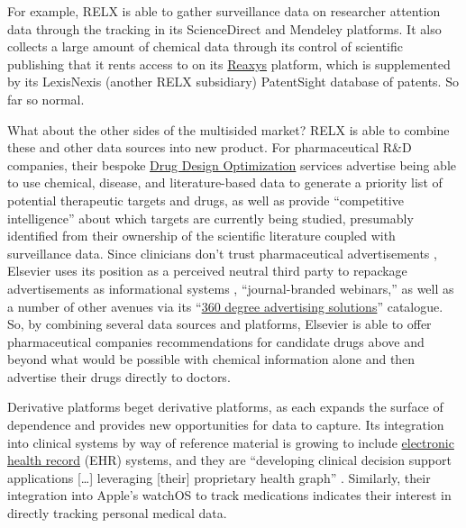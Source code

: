 For example, RELX is able to gather surveillance data on researcher
attention data through the tracking in its ScienceDirect and Mendeley
platforms. It also collects a large amount of chemical data through its
control of scientific publishing that it rents access to on its
\href{https://www.elsevier.com/en-gb/solutions/reaxys}{Reaxys} platform,
which is supplemented by its LexisNexis (another RELX subsidiary)
PatentSight database of patents. So far so normal.

What about the other sides of the multisided market? RELX is able to
combine these and other data sources into new product. For
pharmaceutical R\&D companies, their bespoke
\href{https://web.archive.org/web/20211207070524/https://www.elsevier.com/solutions/professional-services/drug-design-optimization}{Drug
Design Optimization} services advertise being able to use chemical,
disease, and literature-based data to generate a priority list of
potential therapeutic targets and drugs, as well as provide
``competitive intelligence'' about which targets are currently being
studied, presumably identified from their ownership of the scientific
literature coupled with surveillance data. Since clinicians don't trust
pharmaceutical advertisements \cite{elsevierMakingMedicalInformation2021} , Elsevier uses its position as
a perceived neutral third party to repackage advertisements as
informational systems \cite{elsevierRethinkClincalContent2020} ,
``journal-branded webinars,'' as well as a number of other avenues via
its
``\href{https://web.archive.org/web/20211111211058/https://www.elsevier.com/advertising-reprints-supplements/advertising}{360
degree advertising solutions}'' catalogue. So, by combining several data
sources and platforms, Elsevier is able to offer pharmaceutical
companies recommendations for candidate drugs above and beyond what
would be possible with chemical information alone and then advertise
their drugs directly to doctors.

Derivative platforms beget derivative platforms, as each expands the
surface of dependence and provides new opportunities for data to
capture. Its integration into clinical systems by way of reference
material is growing to include
\href{https://web.archive.org/web/20230307020432/https://www.elsevier.com/en-gb/clinical-solutions/clinical-practice}{electronic
health record} (EHR) systems, and they are ``developing clinical
decision support applications {[}\ldots{]} leveraging {[}their{]}
proprietary health graph'' \cite{relxAnnualReport20222023} .
Similarly, their integration into Apple's watchOS to track medications
indicates their interest in directly tracking personal medical data.

